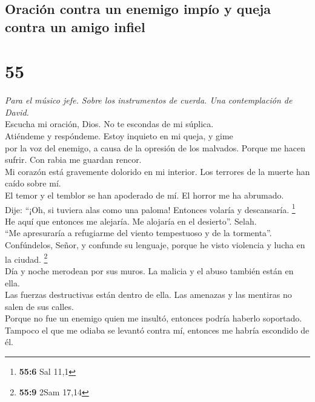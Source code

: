 \hypertarget{oraciuxf3n-contra-un-enemigo-impuxedo-y-queja-contra-un-amigo-infiel}{%
\subsection{Oración contra un enemigo impío y queja contra un amigo
infiel}\label{oraciuxf3n-contra-un-enemigo-impuxedo-y-queja-contra-un-amigo-infiel}}

\hypertarget{section-53}{%
\section{55}\label{section-53}}

\emph{Para el músico jefe. Sobre los instrumentos de cuerda. Una
contemplación de David.}\\
 Escucha mi oración, Dios. No te escondas de mi súplica.\\
 Atiéndeme y respóndeme. Estoy inquieto en mi queja, y
gime\\
 por la voz del enemigo, a causa de la opresión de los
malvados. Porque me hacen sufrir. Con rabia me guardan rencor.\\
 Mi corazón está gravemente dolorido en mi interior. Los
terrores de la muerte han caído sobre mí.\\
 El temor y el temblor se han apoderado de mí. El horror
me ha abrumado.\\
 Dije: ``¡Oh, si tuviera alas como una paloma! Entonces
volaría y descansaría. \footnote{\textbf{55:6} Sal 11,1}\\
 He aquí que entonces me alejaría. Me alojaría en el
desierto''. Selah.\\
 ``Me apresuraría a refugiarme del viento tempestuoso y de
la tormenta''.\\
 Confúndelos, Señor, y confunde su lenguaje, porque he
visto violencia y lucha en la ciudad. \footnote{\textbf{55:9} 2Sam 17,14}\\
 Día y noche merodean por sus muros. La malicia y el
abuso también están en ella.\\
 Las fuerzas destructivas están dentro de ella. Las
amenazas y las mentiras no salen de sus calles.\\
 Porque no fue un enemigo quien me insultó, entonces
podría haberlo soportado. Tampoco el que me odiaba se levantó contra mí,
entonces me habría escondido de él.\\
